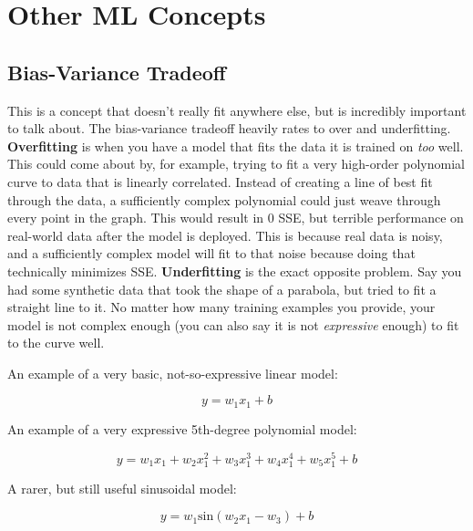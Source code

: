 \section{Other ML Concepts}
\subsection{Bias-Variance Tradeoff}
    \large This is a concept that doesn't really fit anywhere else, but is incredibly important to talk about. The bias-variance tradeoff heavily rates to over and underfitting. \textbf{Overfitting} is when you have a model that fits the data it is trained on \textit{too} well. This could come about by, for example, trying to fit a very high-order polynomial curve to data that is linearly correlated. Instead of creating a line of best fit through the data, a sufficiently complex polynomial could just weave through every point in the graph. This would result in 0 SSE, but terrible performance on real-world data after the model is deployed. This is because real data is noisy, and a sufficiently complex model will fit to that noise because doing that technically minimizes SSE. \textbf{Underfitting} is the exact opposite problem. Say you had some synthetic data that took the shape of a parabola, but tried to fit a straight line to it. No matter how many training examples you provide, your model is not complex enough (you can also say it is not \textit{expressive} enough) to fit to the curve well.

    An example of a very basic, not-so-expressive linear model:

    $$y = w_1x_1 + b$$

    An example of a very expressive 5th-degree polynomial model:

    $$y = w_1x_1 + w_2x_1^2 + w_3x_1^3 + w_4x_1^4 + w_5x_1^5 + b$$

    A rarer, but still useful sinusoidal model:

    $$y = w_1\textrm{sin}(w_2x_1 - w_3) + b$$

